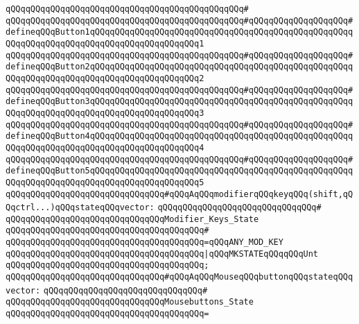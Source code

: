 \verb|qQQqqQQqqQQqqQQqqQQqqQQqqQQqqQQqqQQqqQQqqQQqqQQq#|\newline
\verb|qQQqqQQqqQQqqQQqqQQqqQQqqQQqqQQqqQQqqQQqqQQqqQQq#qQQqqQQqqQQqqQQqqQQq#defineqQQqButton1qQQqqQQqqQQqqQQqqQQqqQQqqQQqqQQqqQQqqQQqqQQqqQQqqQQqqQQqqQQqqQQqqQQqqQQqqQQqqQQqqQQqqQQqqQQq1|\newline
\verb|qQQqqQQqqQQqqQQqqQQqqQQqqQQqqQQqqQQqqQQqqQQqqQQq#qQQqqQQqqQQqqQQqqQQq#defineqQQqButton2qQQqqQQqqQQqqQQqqQQqqQQqqQQqqQQqqQQqqQQqqQQqqQQqqQQqqQQqqQQqqQQqqQQqqQQqqQQqqQQqqQQqqQQqqQQq2|\newline
\verb|qQQqqQQqqQQqqQQqqQQqqQQqqQQqqQQqqQQqqQQqqQQqqQQq#qQQqqQQqqQQqqQQqqQQq#defineqQQqButton3qQQqqQQqqQQqqQQqqQQqqQQqqQQqqQQqqQQqqQQqqQQqqQQqqQQqqQQqqQQqqQQqqQQqqQQqqQQqqQQqqQQqqQQqqQQq3|\newline
\verb|qQQqqQQqqQQqqQQqqQQqqQQqqQQqqQQqqQQqqQQqqQQqqQQq#qQQqqQQqqQQqqQQqqQQq#defineqQQqButton4qQQqqQQqqQQqqQQqqQQqqQQqqQQqqQQqqQQqqQQqqQQqqQQqqQQqqQQqqQQqqQQqqQQqqQQqqQQqqQQqqQQqqQQqqQQq4|\newline
\verb|qQQqqQQqqQQqqQQqqQQqqQQqqQQqqQQqqQQqqQQqqQQqqQQq#qQQqqQQqqQQqqQQqqQQq#defineqQQqButton5qQQqqQQqqQQqqQQqqQQqqQQqqQQqqQQqqQQqqQQqqQQqqQQqqQQqqQQqqQQqqQQqqQQqqQQqqQQqqQQqqQQqqQQqqQQq5|\newline
\newline
\newline
\verb|qQQqqQQqqQQqqQQqqQQqqQQqqQQqqQQq#qQQqAqQQqmodifierqQQqkeyqQQq(shift,qQQqctrl...)qQQqstateqQQqvector:|\newline
\verb|qQQqqQQqqQQqqQQqqQQqqQQqqQQqqQQq#|\newline
\verb|qQQqqQQqqQQqqQQqqQQqqQQqqQQqqQQqModifier_Keys_State|\newline
\verb|qQQqqQQqqQQqqQQqqQQqqQQqqQQqqQQqqQQqqQQq#|\newline
\verb|qQQqqQQqqQQqqQQqqQQqqQQqqQQqqQQqqQQqqQQq=qQQqANY_MOD_KEY|\newline
\verb|qQQqqQQqqQQqqQQqqQQqqQQqqQQqqQQqqQQqqQQq|\verb#|qQQqMKSTATEqQQqqQQqUnt#\newline
\verb|qQQqqQQqqQQqqQQqqQQqqQQqqQQqqQQqqQQqqQQq;|\newline
\newline
\verb|qQQqqQQqqQQqqQQqqQQqqQQqqQQqqQQq#qQQqAqQQqMouseqQQqbuttonqQQqstateqQQqvector:|\newline
\verb|qQQqqQQqqQQqqQQqqQQqqQQqqQQqqQQq#|\newline
\verb|qQQqqQQqqQQqqQQqqQQqqQQqqQQqqQQqMousebuttons_State|\newline
\verb|qQQqqQQqqQQqqQQqqQQqqQQqqQQqqQQqqQQqqQQq=|\newline
